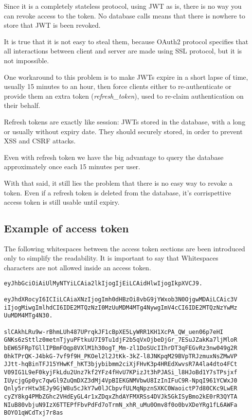 \documentclass[11pt]{style}
\begin{document}
Since it is a completely stateless protocol, using JWT as is, there is no way
you can revoke access to the token. No database calls means that there is
nowhere to store that JWT is been revoked.

It is true that it is not easy to steal them, because OAuth2 protocol specifies
that all interactions between client and server are made using SSL protocol, but
it is not impossible.

One workaround to this problem is to make JWTs expire in a short lapse of time,
usually 15 minutes to an hour, then force clients either to re-authenticate or
provide them an extra token (\textit{refresh\_token}), used to re-claim
authentication on their behalf.

Refresh tokens are exactly like session: JWTs stored in the database, with a
long or usually without expiry date.
They should securely stored, in order to prevent XSS and CSRF attacks.

Even with refresh token we have the big advantage to query the database
approximately once each 15 minutes per user.

With that said, it still lies the problem that there is no easy way to revoke a
token. Even if a refresh token is deleted from the database, it's corrispettive
access token is still usable until expiry.

\subsection{Example of access token}
The following whitespaces between the access token sections are been introduced
only to simplify the readability.
It is important to say that Whitespaces characters are not allowed inside an
access token.

\begin{lstlisting}
eyJhbGciOiAiUlMyNTYiLCAia2lkIjogIjEiLCAidHlwIjogIkpXVCJ9.

eyJhdXRocyI6ICIiLCAiaXNzIjogImh0dHBzOi8vbG9jYWxob3N0OjgwMDAiLCAic3V
iIjogMiwgImlhdCI6IDE2MTQzNzI0MzUuMDM4MTg4NywgImV4cCI6IDE2MTQzNzYwMz
UuMDM4MTg4N30.

slCAkhLRu9w-rBhmLUh487UPrqkJF1cBpXE5LyWRR1KH1XcPA_QW_uen06p7eHI
GNKs6zSttlz0metnTjyuPFtkuU7I9Tu1djF2b5qVxOjbeDjGr_7ESuJZakKa7ljMloR
bEW65FRpTGllIPBmFOqp8VXlM1h30ogT_Mm-zl1DoSUcIIhrDT3qFEGvRz3nw049g2R
0hkTPrQK-J4bkG-7vf9f9H_PKOel2l2JtKk-3kZ-l8JNKpqM29BVpTRJzmuxNsZMwVP
JJtt-hqBinTFJ15YHwKf_hKT3bjybibmm2ciXjFHvK3p4HREdXwvsR7A4la4dto4FCt
V09IG1L9eF0kyjFkLdu2Unz7kf2YFz4fHvU7KPizJt3hPJASi_l8HJoBd1Y7sTPsjxf
IUycjgGp0yc7qwGl9ZuQmDXZ3dMj4VpBIEKGNMVbwU8IzInIFuC9R-NpqI961YCWxJ0
Qnly5rrHtw3EJy9GjW8u5cJkY7w0lJCbpvfULMqNpznSXKC0WaoictP7d80CKc9LwER
cyZY8kg4PMbZGhc2VHdEyGL4r1xZDqxZhdAYFMXRSs4DVJk5GkISyBmo2kE0rR3QYTA
NIuB80vbjuN9IzX6TTEPfFbvPdFd7oTrmN_xhR_uMu0Omv8f0o0bvXDeYRg1fL6AWFa
BOYO1qWCdTxj7r8as
\end{lstlisting}
\end{document}
